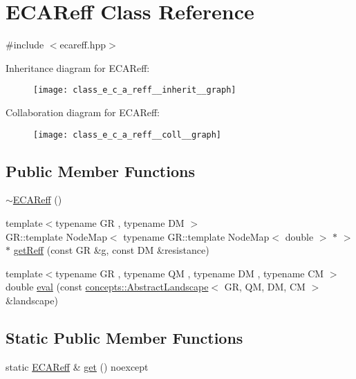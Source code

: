 \hypertarget{class_e_c_a_reff}{}\section{E\+C\+A\+Reff Class Reference}
\label{class_e_c_a_reff}


{\ttfamily \#include $<$ecareff.\+hpp$>$}



Inheritance diagram for E\+C\+A\+Reff\+:\nopagebreak
\begin{figure}[H]
\begin{center}
\leavevmode
\texttt{[image: class\_e\_c\_a\_reff\_\_inherit\_\_graph]}
\end{center}
\end{figure}


Collaboration diagram for E\+C\+A\+Reff\+:\nopagebreak
\begin{figure}[H]
\begin{center}
\leavevmode
\texttt{[image: class\_e\_c\_a\_reff\_\_coll\_\_graph]}
\end{center}
\end{figure}
\subsection*{Public Member Functions}
\begin{DoxyCompactItemize}
\item 
\hyperlink{class_e_c_a_reff_ae1a03ebc18f59b302e11cc3f88570562}{$\sim$\+E\+C\+A\+Reff} ()
\item 
{\footnotesize template$<$typename GR , typename DM $>$ }\\G\+R\+::template Node\+Map$<$ typename G\+R\+::template Node\+Map$<$ double $>$ $\ast$ $>$ $\ast$ \hyperlink{class_e_c_a_reff_afa9b4d597a1771f154eb1179ebfcfd7c}{get\+Reff} (const GR \&g, const DM \&resistance)
\item 
{\footnotesize template$<$typename GR , typename QM , typename DM , typename CM $>$ }\\double \hyperlink{class_e_c_a_reff_a6ae1382bfd570347211838b7fa34b7c7}{eval} (const \hyperlink{classconcepts_1_1_abstract_landscape}{concepts\+::\+Abstract\+Landscape}$<$ GR, QM, DM, CM $>$ \&landscape)
\end{DoxyCompactItemize}
\subsection*{Static Public Member Functions}
\begin{DoxyCompactItemize}
\item 
static \hyperlink{class_e_c_a_reff}{E\+C\+A\+Reff} \& \hyperlink{class_e_c_a_reff_af6d8a1284a194d55123e8a878127c45d}{get} () noexcept
\end{DoxyCompactItemize}
